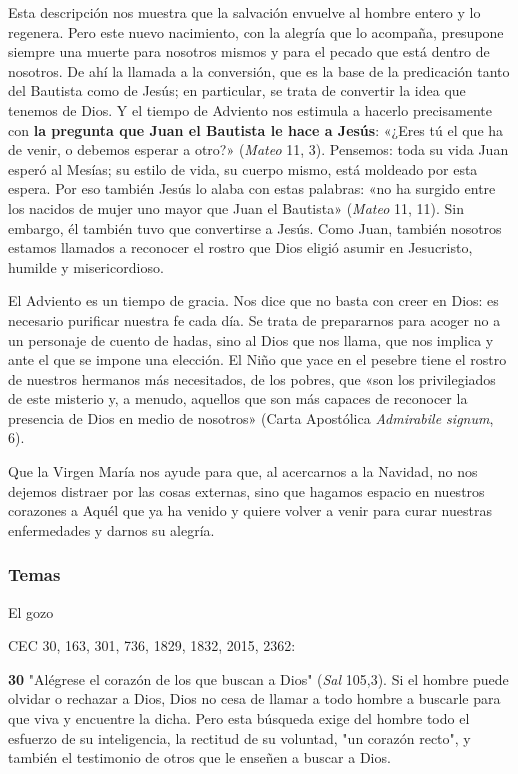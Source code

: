 \documentclass[]{article}
\begin{document}
Esta descripción nos muestra que la salvación envuelve al hombre entero
y lo regenera. Pero este nuevo nacimiento, con la alegría que lo
acompaña, presupone siempre una muerte para nosotros mismos y para el
pecado que está dentro de nosotros. De ahí la llamada a la conversión,
que es la base de la predicación tanto del Bautista como de Jesús; en
particular, se trata de convertir la idea que tenemos de Dios. Y el
tiempo de Adviento nos estimula a hacerlo precisamente con \textbf{la
pregunta que Juan el Bautista le hace a Jesús}: «¿Eres tú el que ha de
venir, o debemos esperar a otro?» (\emph{Mateo} 11, 3). Pensemos: toda
su vida Juan esperó al Mesías; su estilo de vida, su cuerpo mismo, está
moldeado por esta espera. Por eso también Jesús lo alaba con estas
palabras: «no ha surgido entre los nacidos de mujer uno mayor que Juan
el Bautista» (\emph{Mateo} 11, 11). Sin embargo, él también tuvo que
convertirse a Jesús. Como Juan, también nosotros estamos llamados a
reconocer el rostro que Dios eligió asumir en Jesucristo, humilde y
misericordioso.

El Adviento es un tiempo de gracia. Nos dice que no basta con creer en
Dios: es necesario purificar nuestra fe cada día. Se trata de
prepararnos para acoger no a un personaje de cuento de hadas, sino al
Dios que nos llama, que nos implica y ante el que se impone una
elección. El Niño que yace en el pesebre tiene el rostro de nuestros
hermanos más necesitados, de los pobres, que «son los privilegiados de
este misterio y, a menudo, aquellos que son más capaces de reconocer la
presencia de Dios en medio de nosotros» (Carta Apostólica
\emph{Admirabile signum}, 6).

Que la Virgen María nos ayude para que, al acercarnos a la Navidad, no
nos dejemos distraer por las cosas externas, sino que hagamos espacio en
nuestros corazones a Aquél que ya ha venido y quiere volver a venir para
curar nuestras enfermedades y darnos su alegría.

\protect\hypertarget{_Toc448662753}{}{\protect\hypertarget{_Toc448690272}{}{}}

\subsubsection{Temas}\label{temas-2}

El gozo

CEC 30, 163, 301, 736, 1829, 1832, 2015, 2362:

\textbf{30} "Alégrese el corazón de los que buscan a Dios" (\emph{Sal}
105,3). Si el hombre puede olvidar o rechazar a Dios, Dios no cesa de
llamar a todo hombre a buscarle para que viva y encuentre la dicha. Pero
esta búsqueda exige del hombre todo el esfuerzo de su inteligencia, la
rectitud de su voluntad, "un corazón recto", y también el testimonio de
otros que le enseñen a buscar a Dios.
\end{document}
